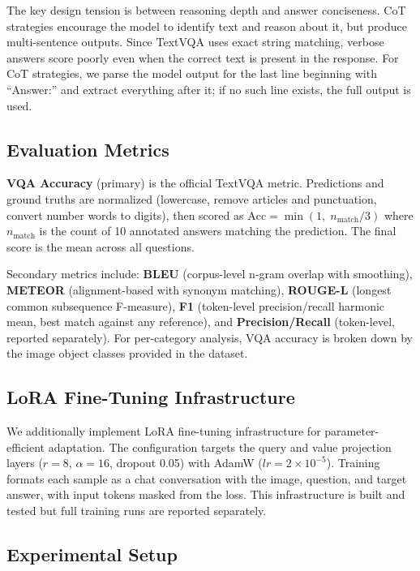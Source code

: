 \documentclass[11pt]{article}
\begin{document}
The key design tension is between reasoning depth and answer conciseness. CoT strategies encourage the model to identify text and reason about it, but produce multi-sentence outputs. Since TextVQA uses exact string matching, verbose answers score poorly even when the correct text is present in the response. For CoT strategies, we parse the model output for the last line beginning with ``Answer:'' and extract everything after it; if no such line exists, the full output is used.

\subsection{Evaluation Metrics}

\textbf{VQA Accuracy} (primary) is the official TextVQA metric. Predictions and ground truths are normalized (lowercase, remove articles and punctuation, convert number words to digits), then scored as $\text{Acc} = \min(1,\; n_{\text{match}} / 3)$ where $n_{\text{match}}$ is the count of 10 annotated answers matching the prediction. The final score is the mean across all questions.

Secondary metrics include: \textbf{BLEU} (corpus-level n-gram overlap with smoothing), \textbf{METEOR} (alignment-based with synonym matching), \textbf{ROUGE-L} (longest common subsequence F-measure), \textbf{F1} (token-level precision/recall harmonic mean, best match against any reference), and \textbf{Precision/Recall} (token-level, reported separately). For per-category analysis, VQA accuracy is broken down by the image object classes provided in the dataset.

\subsection{LoRA Fine-Tuning Infrastructure}

We additionally implement LoRA \citep{hu2022lora} fine-tuning infrastructure for parameter-efficient adaptation. The configuration targets the query and value projection layers ($r=8$, $\alpha=16$, dropout 0.05) with AdamW ($lr=2 \times 10^{-5}$). Training formats each sample as a chat conversation with the image, question, and target answer, with input tokens masked from the loss. This infrastructure is built and tested but full training runs are reported separately.

\subsection{Experimental Setup}
\end{document}
